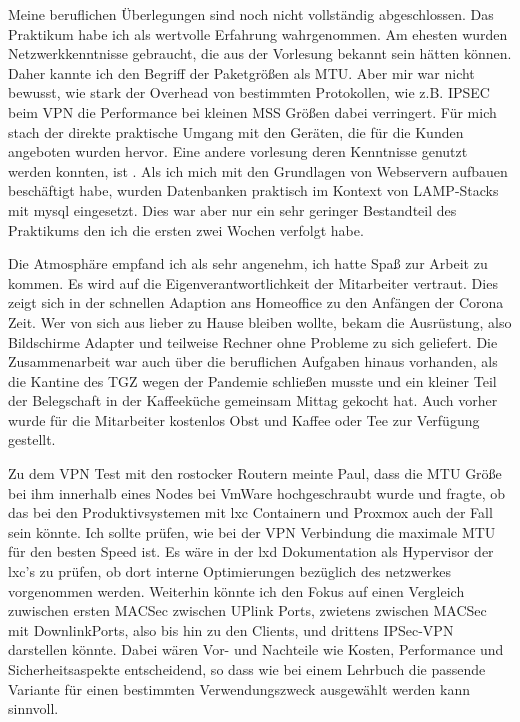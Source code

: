 \documentclass[english,runningheads,a4paper]{llncs}[2018/03/10]
\begin{document}
Meine beruflichen Überlegungen sind noch nicht vollständig abgeschlossen. Das Praktikum habe ich als wertvolle Erfahrung wahrgenommen.
Am ehesten wurden Netzwerkkenntnisse gebraucht, die aus der Vorlesung  bekannt sein hätten können. Daher kannte ich den Begriff der Paketgrößen als MTU. Aber mir war nicht bewusst, wie stark der Overhead von bestimmten Protokollen, wie z.B. IPSEC beim VPN die Performance bei kleinen MSS Größen dabei verringert. Für mich stach der direkte praktische Umgang mit den Geräten, die für die Kunden angeboten wurden hervor. 
Eine andere vorlesung deren Kenntnisse genutzt werden konnten, ist . Als ich mich mit den Grundlagen von Webservern aufbauen beschäftigt habe, wurden Datenbanken praktisch im Kontext von LAMP-Stacks mit mysql eingesetzt. Dies war aber nur ein sehr geringer Bestandteil des Praktikums den ich die ersten zwei Wochen verfolgt habe.

Die Atmosphäre empfand ich als sehr angenehm, ich hatte Spaß zur Arbeit zu kommen. Es wird auf die Eigenverantwortlichkeit der Mitarbeiter vertraut. Dies zeigt sich in der schnellen Adaption ans Homeoffice zu den Anfängen der Corona Zeit. Wer von sich aus lieber zu Hause bleiben wollte, bekam die Ausrüstung, also Bildschirme Adapter und teilweise Rechner ohne Probleme zu sich geliefert.
Die Zusammenarbeit war auch über die beruflichen Aufgaben hinaus vorhanden, als die Kantine des TGZ wegen der Pandemie schließen musste und ein kleiner Teil der Belegschaft in der Kaffeeküche gemeinsam Mittag gekocht hat. Auch vorher wurde für die Mitarbeiter kostenlos Obst und Kaffee oder Tee zur Verfügung gestellt.

Zu dem VPN Test mit den rostocker Routern meinte Paul, dass die MTU Größe bei ihm innerhalb eines Nodes bei VmWare hochgeschraubt wurde und fragte, ob das bei den Produktivsystemen mit lxc Containern und Proxmox auch der Fall sein könnte. Ich sollte prüfen, wie bei der VPN Verbindung die maximale MTU für den besten Speed ist. Es wäre in der lxd Dokumentation als Hypervisor der lxc's zu prüfen, ob dort interne Optimierungen bezüglich des netzwerkes vorgenommen werden.
Weiterhin könnte ich den Fokus auf einen Vergleich zuwischen ersten MACSec zwischen UPlink Ports, zwietens zwischen MACSec mit DownlinkPorts, also bis hin zu den Clients, und drittens IPSec-VPN darstellen könnte. Dabei wären Vor- und Nachteile wie Kosten, Performance und Sicherheitsaspekte entscheidend, so dass wie bei einem Lehrbuch die passende Variante für einen bestimmten Verwendungszweck ausgewählt werden kann sinnvoll.
\end{document}
